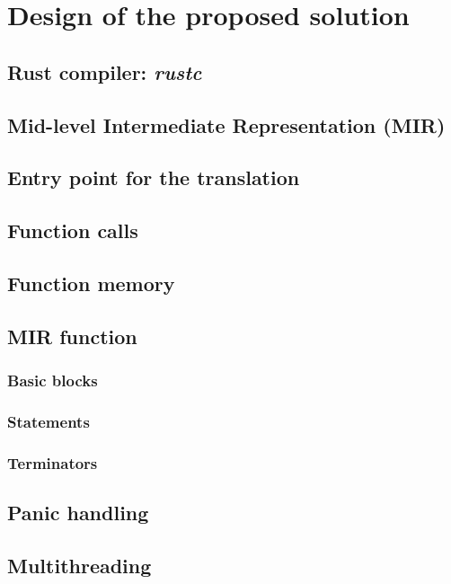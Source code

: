 \chapter{Design of the proposed solution}

\section{Rust compiler: \textit{rustc}}

\section{Mid-level Intermediate Representation (MIR)}

\section{Entry point for the translation}

\section{Function calls}

\section{Function memory}

\section{MIR function}

\subsection{Basic blocks}

\subsection{Statements}

\subsection{Terminators}

\section{Panic handling}

\section{Multithreading}

